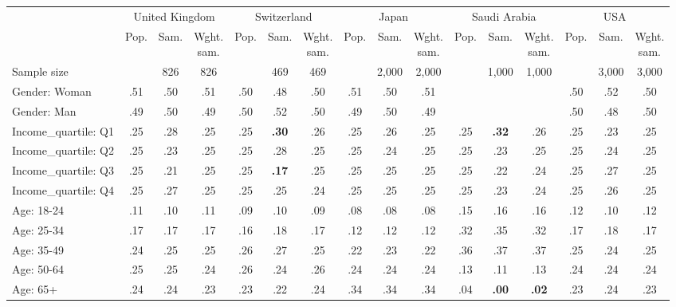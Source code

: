 
\begin{tabular}[t]{lccccccccccccccc}
\toprule
\multicolumn{1}{c}{} & \multicolumn{3}{c}{United Kingdom} & \multicolumn{3}{c}{Switzerland} & \multicolumn{3}{c}{Japan} & \multicolumn{3}{c}{Saudi Arabia} & \multicolumn{3}{c}{USA} \\
\cmidrule(l{3pt}r{3pt}){2-4} \cmidrule(l{3pt}r{3pt}){5-7} \cmidrule(l{3pt}r{3pt}){8-10} \cmidrule(l{3pt}r{3pt}){11-13} \cmidrule(l{3pt}r{3pt}){14-16}
  & Pop. & Sam. & \makecell{Wght.\\sam.} & Pop. & Sam. & \makecell{Wght.\\sam.} & Pop. & Sam. & \makecell{Wght.\\sam.} & Pop. & Sam. & \makecell{Wght.\\sam.} & Pop. & Sam. & \makecell{Wght.\\sam.}\\
\midrule
Sample size &  & 826 & 826 &  & 469 & 469 &  & 2,000 & 2,000 &  & 1,000 & 1,000 &  & 3,000 & 3,000\\
\addlinespace
Gender: Woman & .51 & .50 & .51 & .50 & .48 & .50 & .51 & .50 & .51 &  &  &  & .50 & .52 & .50\\
Gender: Man & .49 & .50 & .49 & .50 & .52 & .50 & .49 & .50 & .49 &  &  &  & .50 & .48 & .50\\
\addlinespace
Income\_quartile: Q1 & .25 & .28 & .25 & .25 & \textbf{.30} & .26 & .25 & .26 & .25 & .25 & \textbf{.32} & .26 & .25 & .23 & .25\\
Income\_quartile: Q2 & .25 & .23 & .25 & .25 & .28 & .25 & .25 & .24 & .25 & .25 & .23 & .25 & .25 & .24 & .25\\
Income\_quartile: Q3 & .25 & .21 & .25 & .25 & \textbf{.17} & .25 & .25 & .25 & .25 & .25 & .22 & .24 & .25 & .27 & .25\\
Income\_quartile: Q4 & .25 & .27 & .25 & .25 & .25 & .24 & .25 & .25 & .25 & .25 & .23 & .24 & .25 & .26 & .25\\
\addlinespace
Age: 18-24 & .11 & .10 & .11 & .09 & .10 & .09 & .08 & .08 & .08 & .15 & .16 & .16 & .12 & .10 & .12\\
Age: 25-34 & .17 & .17 & .17 & .16 & .18 & .17 & .12 & .12 & .12 & .32 & .35 & .32 & .17 & .18 & .17\\
Age: 35-49 & .24 & .25 & .25 & .26 & .27 & .25 & .22 & .23 & .22 & .36 & .37 & .37 & .25 & .24 & .25\\
Age: 50-64 & .25 & .25 & .24 & .26 & .24 & .26 & .24 & .24 & .24 & .13 & .11 & .13 & .24 & .24 & .24\\
Age: 65+ & .24 & .24 & .23 & .23 & .22 & .24 & .34 & .34 & .34 & .04 & \textbf{.00} & \textbf{.02} & .23 & .24 & .23\\

\end{tabular}
